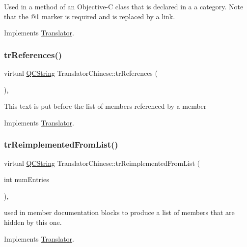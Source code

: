 Used in a method of an Objective-\/C class that is declared in a a category. Note that the @1 marker is required and is replaced by a link. 

Implements \mbox{\hyperlink{class_translator}{Translator}}.

\mbox{\label{class_translator_chinese_a2ec6727ed78fb159ee6a95e8aa2132bf}} 
\subsubsection{\texorpdfstring{trReferences()}{trReferences()}}
{\footnotesize\ttfamily virtual \mbox{\hyperlink{class_q_c_string}{Q\+C\+String}} Translator\+Chinese\+::tr\+References (\begin{DoxyParamCaption}{ }\end{DoxyParamCaption})\hspace{0.3cm}{\ttfamily [inline]}, {\ttfamily [virtual]}}

This text is put before the list of members referenced by a member 

Implements \mbox{\hyperlink{class_translator}{Translator}}.

\mbox{\label{class_translator_chinese_a66515ccb68d26ac78c6159875c6d70d9}} 
\subsubsection{\texorpdfstring{trReimplementedFromList()}{trReimplementedFromList()}}
{\footnotesize\ttfamily virtual \mbox{\hyperlink{class_q_c_string}{Q\+C\+String}} Translator\+Chinese\+::tr\+Reimplemented\+From\+List (\begin{DoxyParamCaption}\item[{int}]{num\+Entries }\end{DoxyParamCaption})\hspace{0.3cm}{\ttfamily [inline]}, {\ttfamily [virtual]}}

used in member documentation blocks to produce a list of members that are hidden by this one. 

Implements \mbox{\hyperlink{class_translator}{Translator}}.

